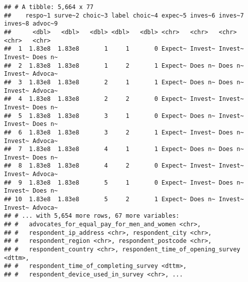 \documentclass[
]{article}
\newenvironment{Shaded}{\begin{snugshade}}{\end{snugshade}}
\newcommand{\CommentTok}[1]{\textcolor[rgb]{0.56,0.35,0.01}{\textit{#1}}}
\newcommand{\FloatTok}[1]{\textcolor[rgb]{0.00,0.00,0.81}{#1}}
\newcommand{\FunctionTok}[1]{\textcolor[rgb]{0.00,0.00,0.00}{#1}}
\newcommand{\NormalTok}[1]{#1}
\newcommand{\OtherTok}[1]{\textcolor[rgb]{0.56,0.35,0.01}{#1}}
\newcommand{\SpecialCharTok}[1]{\textcolor[rgb]{0.00,0.00,0.00}{#1}}
\begin{document}
\begin{verbatim}
## # A tibble: 5,664 x 77
##    respo~1 surve~2 choic~3 label choic~4 expec~5 inves~6 inves~7 inves~8 advoc~9
##      <dbl>   <dbl>   <dbl> <dbl>   <dbl> <chr>   <chr>   <chr>   <chr>   <chr>  
##  1  1.83e8  1.83e8       1     1       0 Expect~ Invest~ Invest~ Invest~ Does n~
##  2  1.83e8  1.83e8       1     2       1 Expect~ Does n~ Does n~ Invest~ Advoca~
##  3  1.83e8  1.83e8       2     1       1 Expect~ Does n~ Does n~ Invest~ Advoca~
##  4  1.83e8  1.83e8       2     2       0 Expect~ Invest~ Invest~ Invest~ Does n~
##  5  1.83e8  1.83e8       3     1       0 Expect~ Does n~ Invest~ Invest~ Does n~
##  6  1.83e8  1.83e8       3     2       1 Expect~ Invest~ Does n~ Invest~ Advoca~
##  7  1.83e8  1.83e8       4     1       1 Expect~ Does n~ Does n~ Invest~ Does n~
##  8  1.83e8  1.83e8       4     2       0 Expect~ Invest~ Invest~ Invest~ Advoca~
##  9  1.83e8  1.83e8       5     1       0 Expect~ Invest~ Does n~ Invest~ Does n~
## 10  1.83e8  1.83e8       5     2       1 Expect~ Does n~ Invest~ Invest~ Advoca~
## # ... with 5,654 more rows, 67 more variables:
## #   advocates_for_equal_pay_for_men_and_women <chr>,
## #   respondent_ip_address <chr>, respondent_city <chr>,
## #   respondent_region <chr>, respondent_postcode <chr>,
## #   respondent_country <chr>, respondent_time_of_opening_survey <dttm>,
## #   respondent_time_of_completing_survey <dttm>,
## #   respondent_device_used_in_survey <chr>, ...
\end{verbatim}

\begin{Shaded}
\end{Shaded}
\end{document}
